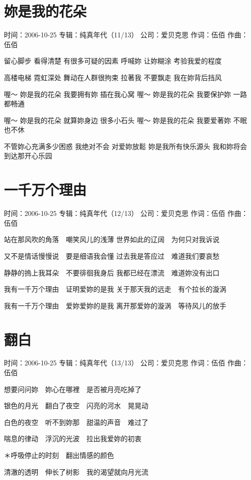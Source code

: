 \documentclass[UTF8,a4paper,oneside,twocolumn,12pt]{ctexbook}
\newcommand{\infopair}[2]{\textbullet #1：#2}
\newcommand{\zc}[1][伍佰]{\infopair{作词}{#1}}
\newcommand{\zq}[1][伍佰]{\infopair{作曲}{#1}}
\newcommand{\zj}[1]{\infopair{专辑}{#1}}
\newcommand{\sj}[1]{\infopair{时间}{#1}}
\newcommand{\gs}[1]{\infopair{公司}{#1}}
\newenvironment{info}{\begin{flushleft}\kaishu
	}
	{\end{flushleft}\normalsize\yahei\par}
\newenvironment{lyric}{
	}
{}
\begin{document}
\section{妳是我的花朵}
\begin{info}
	\sj{2006-10-25}
	\zj{纯真年代（11/13）}
	\gs{爱贝克思}
	\zc
	\zq
\end{info}
\begin{lyric}
	留心脚步 看得清楚 有很多可疑的因素
	呼喊妳 让妳糊涂 考验我爱的程度

	高楼电梯 霓虹深处 舞动在人群很拘束
	拉著我 不要飘走 我在妳背后挡风

	喔～ 妳是我的花朵 我要拥有妳 插在我心窝
	喔～ 妳是我的花朵 我要保护妳 一路都畅通

	喔～ 妳是我的花朵 就算妳身边 很多小石头
	喔～ 妳是我的花朵 我要爱著妳 不眠也不休

	不管妳心充满多少困惑 我绝对不会 对爱妳放鬆
	妳是我所有快乐源头 我和妳将会 到达那开心乐园
\end{lyric}

\section{一千万个理由}
\begin{info}
	\sj{2006-10-25}
	\zj{纯真年代（12/13）}
	\gs{爱贝克思}
	\zc
	\zq
\end{info}
\begin{lyric}
	站在那风吹的角落　嘲笑风儿的浅薄
	世界如此的辽阔　为何只对我诉说

	又不是情话慢慢说　要是细语我会懂
	过去我是答应过　难道我们要哀愁

	静静的摀上我耳朵　不要徘徊我身后
	我都已经在漂流　难道妳没有出口

	我有一千万个理由　证明爱妳的是我
	关于那天我的远走　有个拉长的漩涡

	我有一千万个理由　爱妳爱妳的是我
	离开那爱妳的漩涡　等待风儿的放手
\end{lyric}

\section{翻白}
\begin{info}
	\sj{2006-10-25}
	\zj{纯真年代（13/13）}
	\gs{爱贝克思}
	\zc
	\zq
\end{info}
\begin{lyric}
	想要问问妳　妳心在哪裡　是否被月亮吃掉了

	银色的月光　翻白了夜空　闪亮的河水　晃晃动

	白色的夜空　听不到妳那　甜温的声音　难过了

	喘息的律动　浮沉的光波　拉出我爱妳的初衷

	＊呼吸停止的时刻　翻出情感的颜色

	清澈的透明　伸长了树影　我的渴望就向月光流
\end{lyric}
\end{document}
